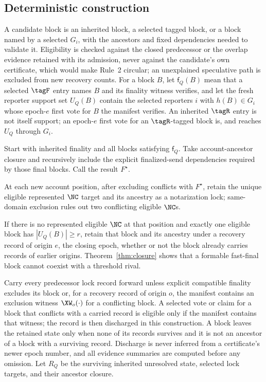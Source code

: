 \subsection{Deterministic construction}
\label{sec:build}
A candidate block is an inherited block, a selected tagged block, or a block named by a selected $G_i$, with the ancestors and fixed dependencies needed to validate it. Eligibility is checked against the closed predecessor or the overlap evidence retained with its admission, never against the candidate's own certificate, which would make Rule~2 circular; an unexplained speculative path is excluded from new recovery counts. For a block $B$, let $\mathsf{f}_Q(B)$ mean that a selected $\tagF$ entry names $B$ and its finality witness verifies, and let the fresh reporter support set $U_Q(B)$ contain the selected reporters $i$ with $h(B)\in G_i$ whose epoch-$e$ first vote for $B$ the manifest verifies. An inherited $\tagR$ entry is not itself support; an epoch-$e$ first vote for an $\tagR$-tagged block is, and reaches $U_Q$ through $G_i$.

Start with inherited finality and all blocks satisfying $\mathsf{f}_Q$. Take account-ancestor closure and recursively include the explicit finalized-send dependencies required by those final blocks. Call the result $F^\star$.

At each new account position, after excluding conflicts with $F^\star$, retain the unique eligible represented $\NC$ target and its ancestry as a notarization lock; same-domain exclusion rules out two conflicting eligible $\NC$s.

If there is no represented eligible $\NC$ at that position and exactly one eligible block has $|U_Q(B)|\geq r$, retain that block and its ancestry under a recovery record of origin $e$, the closing epoch, whether or not the block already carries records of earlier origins. Theorem~\ref{thm:closure} shows that a formable fast-final block cannot coexist with a threshold rival.

Carry every predecessor lock record forward unless explicit compatible finality excludes its block or, for a recovery record of origin $o$, the manifest contains an exclusion witness $\XW_o(\cdot)$ for a conflicting block. A selected vote or claim for a block that conflicts with a carried record is eligible only if the manifest contains that witness; the record is then discharged in this construction. A block leaves the retained state only when none of its records survives and it is not an ancestor of a block with a surviving record. Discharge is never inferred from a certificate's newer epoch number, and all evidence summaries are computed before any omission. Let $R_Q$ be the surviving inherited unresolved state, selected lock targets, and their ancestor closure.

